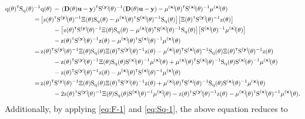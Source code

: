 \begin{align}
        \vcq(\vctheta)^\tr\Sqtheta^{-1}&\vcq(\vctheta)\, - \, (\mathbf{D}(\vctheta)\mathbf{u}-\mathbf{y})^\tr\Sbfytheta^{-1}(\mathbf{D}(\vctheta)\mathbf{u}-\mathbf{y}) - \mubfxtheta^\tr\Sbfxtheta^{-1}\mubfxtheta
        \\
        =\,& 
        \big[ 
            \vcz(\vctheta)^\tr \Sbfytheta^{-1} \Xi(\vctheta) \Sqtheta 
            - 
            \mubfxtheta^\tr\Sbfxtheta^{-1}\Sqtheta 
        \big]
        \big[\Xi(\vctheta)^\tr\Sbfytheta^{-1}\vcz(\vctheta) \big] 
        \nonumber\\&\qquad
        -
        \big[ 
            \vcz(\vctheta)^\tr \Sbfytheta^{-1} \Xi(\vctheta) \Sqtheta 
            - 
            \mubfxtheta^\tr\Sbfxtheta^{-1}\Sqtheta
        \big]
        \big[ \Sbfxtheta^{-1} \mubfxtheta \big] 
        \nonumber
        \\&\qquad
        - 
        \vcz(\vctheta)^\tr \Sbfytheta^{-1} \vcz(\vctheta) 
        - 
        \mubfxtheta^\tr \Sbfxtheta^{-1} \mubfxtheta
        \\
        =\,& 
        \vcz(\vctheta)^\tr\Sbfytheta^{-1}\Xi(\vctheta)\Sqtheta \Xi(\vctheta)^\tr\Sbfytheta^{-1}\vcz(\vctheta)  
        - 
        \mubfxtheta^\tr\Sbfxtheta^{-1}\Sqtheta \Xi(\vctheta)^\tr\Sbfytheta^{-1}\vcz(\vctheta) 
        \nonumber\\&\qquad
        -
        \vcz(\vctheta)^\tr\Sbfytheta^{-1}\Xi(\vctheta)\Sqtheta \Sbfxtheta^{-1}\mubfxtheta 
        + 
        \mubfxtheta^\tr\Sbfxtheta^{-1}\Sqtheta  \Sbfxtheta^{-1}\mubfxtheta
        \nonumber\\&\qquad
        - \vcz(\vctheta)^\tr\Sbfytheta^{-1}\vcz(\vctheta) - \mubfxtheta^\tr\Sbfxtheta^{-1}\mubfxtheta
        \\
       =\,& 
       \vcz(\vctheta)^\tr\Sbfytheta^{-1}\Xi(\vctheta)\mxS_{\vcq}(\vctheta)\Xi(\vctheta)^\tr\Sbfytheta^{-1}\vcz(\vctheta) + \mubfxtheta^\tr\Sbfxtheta^{-1}\mxS_{\vcq}(\vctheta)\Sbfxtheta^{-1}\mubfxtheta 
       \nonumber\\&\qquad
       - 2\vcz(\vctheta)^\tr\Sbfytheta^{-1}\Xi(\vctheta)\Sqtheta\Sbfxtheta^{-1}\mubfxtheta - \vcz(\vctheta)^\tr\Sbfytheta^{-1}\vcz(\vctheta) - \mubfxtheta^\tr\Sbfxtheta^{-1}\mubfxtheta.
\end{align}
Additionally, by applying \eqref{eq:F-1} and \eqref{eq:Sq-1}, the above equation reduces to
